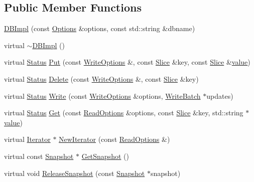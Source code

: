 \subsection*{Public Member Functions}
\begin{DoxyCompactItemize}
\item 
\hyperlink{classleveldb_1_1_d_b_impl_a269b55605b27271d6ca5fee68af0d8f3}{D\+B\+Impl} (const \hyperlink{structleveldb_1_1_options}{Options} \&options, const std\+::string \&dbname)
\item 
virtual \hyperlink{classleveldb_1_1_d_b_impl_a07a233a94a2531aed9d3718c9b9ed40d}{$\sim$\+D\+B\+Impl} ()
\item 
virtual \hyperlink{classleveldb_1_1_status}{Status} \hyperlink{classleveldb_1_1_d_b_impl_ad0d56aeb4d84ff9632c9a7f3f1b7c4d5}{Put} (const \hyperlink{structleveldb_1_1_write_options}{Write\+Options} \&, const \hyperlink{classleveldb_1_1_slice}{Slice} \&key, const \hyperlink{classleveldb_1_1_slice}{Slice} \&\hyperlink{cache_8cc_a0f61d63b009d0880a89c843bd50d8d76}{value})
\item 
virtual \hyperlink{classleveldb_1_1_status}{Status} \hyperlink{classleveldb_1_1_d_b_impl_af050f77e8c22bd6638fed5a46a59399d}{Delete} (const \hyperlink{structleveldb_1_1_write_options}{Write\+Options} \&, const \hyperlink{classleveldb_1_1_slice}{Slice} \&key)
\item 
virtual \hyperlink{classleveldb_1_1_status}{Status} \hyperlink{classleveldb_1_1_d_b_impl_ac0d0b472717099d6a02ad9dace4e8ef4}{Write} (const \hyperlink{structleveldb_1_1_write_options}{Write\+Options} \&options, \hyperlink{classleveldb_1_1_write_batch}{Write\+Batch} $\ast$updates)
\item 
virtual \hyperlink{classleveldb_1_1_status}{Status} \hyperlink{classleveldb_1_1_d_b_impl_a089964ddcd1f5dc85e73499ae57be508}{Get} (const \hyperlink{structleveldb_1_1_read_options}{Read\+Options} \&options, const \hyperlink{classleveldb_1_1_slice}{Slice} \&key, std\+::string $\ast$\hyperlink{cache_8cc_a0f61d63b009d0880a89c843bd50d8d76}{value})
\item 
virtual \hyperlink{classleveldb_1_1_iterator}{Iterator} $\ast$ \hyperlink{classleveldb_1_1_d_b_impl_ae955dc8f2a1c38588723a0882653cb58}{New\+Iterator} (const \hyperlink{structleveldb_1_1_read_options}{Read\+Options} \&)
\item 
virtual const \hyperlink{classleveldb_1_1_snapshot}{Snapshot} $\ast$ \hyperlink{classleveldb_1_1_d_b_impl_a4bec3d8ffd65fec562b2dd1f6eaba137}{Get\+Snapshot} ()
\item 
virtual void \hyperlink{classleveldb_1_1_d_b_impl_a6c0b6abfc9a30cc8e5412d4fc3e8c886}{Release\+Snapshot} (const \hyperlink{classleveldb_1_1_snapshot}{Snapshot} $\ast$snapshot)

\end{DoxyCompactItemize}
